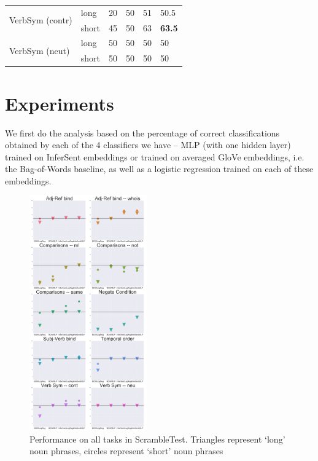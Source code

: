 \documentclass[10pt,letterpaper]{article}
\begin{document}
\begin{center}
\begin{table}[ht!]
\begin{tabular}{||l | l | l | l | l | l ||}
	\multirow{2}{*}{\parbox{1.3cm}{VerbSym (contr)}} &long&20&50&51&50.5 \\
    \cline{2-6}
     &short&45&50&63&\textbf{63.5}  \\
     \hline
    
    \multirow{2}{*}{\parbox{1.3cm}{VerbSym (neut)}} &long&50&50&50&50\\
    \cline{2-6}
     &short&50&50&50&50\\
     \hline
    
    
     \hline
  \end{tabular}
 
\end{table}
\end{center}



\section{Experiments}
We first do the analysis based on the percentage of correct classifications obtained by each of the 4 classifiers we have -- MLP (with one hidden layer) trained on InferSent embeddings or trained on averaged GloVe embeddings, i.e. the Bag-of-Words baseline, as well as a logistic regression trained on each of these embeddings.
\begin{figure}[t!]
\centering
\includegraphics[width=0.45\textwidth]{AllTasks.png}
\caption{Performance on all tasks in ScrambleTest. Triangles represent `long' noun phrases, circles represent `short' noun phrases}
\label{fig:AllTasks}
\end{figure}
\end{document}
